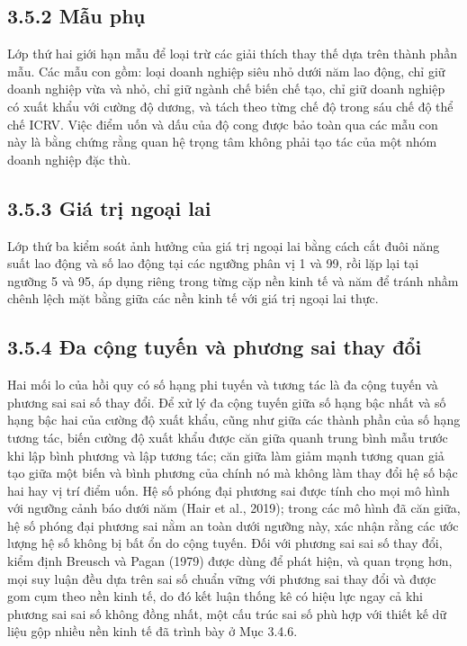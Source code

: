 \documentclass[
  a4paper,
  13pt]{extreport}
\begin{document}
\hypertarget{mux1eabu-phux1ee5}{%
\subsection{3.5.2 Mẫu phụ}\label{mux1eabu-phux1ee5}}

Lớp thứ hai giới hạn mẫu để loại trừ các giải thích thay thế dựa trên
thành phần mẫu. Các mẫu con gồm: loại doanh nghiệp siêu nhỏ dưới năm lao
động, chỉ giữ doanh nghiệp vừa và nhỏ, chỉ giữ ngành chế biến chế tạo,
chỉ giữ doanh nghiệp có xuất khẩu với cường độ dương, và tách theo từng
chế độ trong sáu chế độ thể chế ICRV. Việc điểm uốn và dấu của độ cong
được bảo toàn qua các mẫu con này là bằng chứng rằng quan hệ trọng tâm
không phải tạo tác của một nhóm doanh nghiệp đặc thù.

\hypertarget{giuxe1-trux1ecb-ngoux1ea1i-lai}{%
\subsection{3.5.3 Giá trị ngoại
lai}\label{giuxe1-trux1ecb-ngoux1ea1i-lai}}

Lớp thứ ba kiểm soát ảnh hưởng của giá trị ngoại lai bằng cách cắt đuôi
năng suất lao động và số lao động tại các ngưỡng phân vị 1 và 99, rồi
lặp lại tại ngưỡng 5 và 95, áp dụng riêng trong từng cặp nền kinh tế và
năm để tránh nhầm chênh lệch mặt bằng giữa các nền kinh tế với giá trị
ngoại lai thực.

\hypertarget{ux111a-cux1ed9ng-tuyux1ebfn-vuxe0-phux1b0ux1a1ng-sai-thay-ux111ux1ed5i}{%
\subsection{3.5.4 Đa cộng tuyến và phương sai thay
đổi}\label{ux111a-cux1ed9ng-tuyux1ebfn-vuxe0-phux1b0ux1a1ng-sai-thay-ux111ux1ed5i}}

Hai mối lo của hồi quy có số hạng phi tuyến và tương tác là đa cộng
tuyến và phương sai sai số thay đổi. Để xử lý đa cộng tuyến giữa số hạng
bậc nhất và số hạng bậc hai của cường độ xuất khẩu, cũng như giữa các
thành phần của số hạng tương tác, biến cường độ xuất khẩu được căn giữa
quanh trung bình mẫu trước khi lập bình phương và lập tương tác; căn
giữa làm giảm mạnh tương quan giả tạo giữa một biến và bình phương của
chính nó mà không làm thay đổi hệ số bậc hai hay vị trí điểm uốn. Hệ số
phóng đại phương sai được tính cho mọi mô hình với ngưỡng cảnh báo dưới
năm (Hair et al., 2019); trong các mô hình đã căn giữa, hệ số phóng đại
phương sai nằm an toàn dưới ngưỡng này, xác nhận rằng các ước lượng hệ
số không bị bất ổn do cộng tuyến. Đối với phương sai sai số thay đổi,
kiểm định Breusch và Pagan (1979) được dùng để phát hiện, và quan trọng
hơn, mọi suy luận đều dựa trên sai số chuẩn vững với phương sai thay đổi
và được gom cụm theo nền kinh tế, do đó kết luận thống kê có hiệu lực
ngay cả khi phương sai sai số không đồng nhất, một cấu trúc sai số phù
hợp với thiết kế dữ liệu gộp nhiều nền kinh tế đã trình bày ở Mục 3.4.6.
\end{document}

